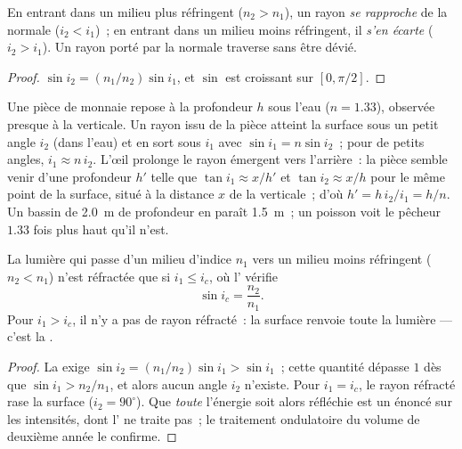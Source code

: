\begin{proposition}\label{prop:b1:rays-reflection-refraction:bending}
En entrant dans un milieu plus réfringent ($n_2 > n_1$), un rayon
\emph{se rapproche} de la normale ($i_2 < i_1$)~; en entrant dans un
milieu moins réfringent, il \emph{s'en écarte} ($i_2 > i_1$). Un rayon
porté par la normale traverse sans être dévié.
\end{proposition}

\begin{proof}
$\sin i_2 = (n_1/n_2)\sin i_1$, et $\sin$ est croissant sur
$[0, \pi/2]$.
\end{proof}

\begin{example}\label{ex:b1:rays-reflection-refraction:depth}
Une pièce de monnaie repose à la profondeur $h$ sous l'eau ($n = 1.33$),
observée presque à la verticale. Un rayon issu de la pièce atteint la
surface sous un petit angle $i_2$ (dans l'eau) et en sort sous $i_1$
avec $\sin i_1 = n\sin i_2$~; pour de petits angles, $i_1 \approx n\,i_2$.
L'œil prolonge le rayon émergent vers l'arrière~: la pièce semble venir
d'une profondeur $h'$ telle que $\tan i_1 \approx x/h'$ et
$\tan i_2 \approx x/h$ pour le même point de la surface, situé à la
distance $x$ de la verticale~; d'où $h' = h\,i_2/i_1 = h/n$. Un bassin de
\qty{2.0}{m} de profondeur en paraît \qty{1.5}{m}~; un poisson voit le
pêcheur $1.33$ fois plus haut qu'il n'est.
\end{example}

\begin{theorem}\label{thm:b1:rays-reflection-refraction:tir}
La lumière qui passe d'un milieu d'indice $n_1$ vers un milieu moins
réfringent ($n_2 < n_1$) n'est réfractée que si $i_1 \leq i_c$, où
l'\emph{} vérifie
\[
\sin i_c = \frac{n_2}{n_1} .
\]
Pour $i_1 > i_c$, il n'y a pas de rayon réfracté~: la surface renvoie
toute la lumière --- c'est la \emph{}.
\end{theorem}

\begin{proof}
La  exige $\sin i_2 = (n_1/n_2)\sin i_1 > \sin i_1$~;
cette quantité dépasse $1$ dès que $\sin i_1 > n_2/n_1$, et alors aucun
angle $i_2$ n'existe. Pour $i_1 = i_c$, le rayon réfracté rase la
surface ($i_2 = 90^\circ$). Que \emph{toute} l'énergie soit alors
réfléchie est un énoncé sur les intensités, dont l'
ne traite pas~; le traitement ondulatoire du volume de deuxième année le
confirme.
\end{proof}


